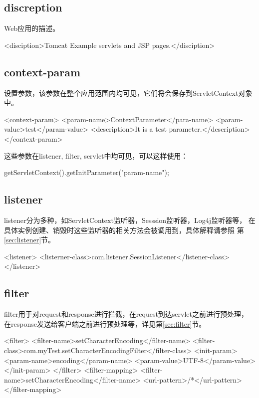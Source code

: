 \documentclass[a4paper,11pt]{article}
\begin{document}
\subsection[discreption]{discreption}
Web应用的描述。

\begin{xmlcode}
<disciption>Tomcat Example servlets and JSP pages.</disciption>
\end{xmlcode}

\subsection[context-param]{context-param}
设置参数，该参数在整个应用范围内均可见，它们将会保存到ServletContext对象中。

\begin{xmlcode}
<context-param>
    <param-name>ContextParameter</para-name>
    <param-value>test</param-value>
    <description>It is a test parameter.</description>
</context-param>
\end{xmlcode}

这些参数在listener, filter, servlet中均可见，可以这样使用：

getServletContext().getInitParameter("param-name");


\subsection[listener]{listener}
listener分为多种，如ServletContext监听器，Sesssion监听器，Log4j监听器等，
在具体实例创建、销毁时这些监听器的相关方法会被调用到，具体解释请参照
第\ref{sec:listener}节。

\begin{xmlcode}
<listener> 
    <listerner-class>com.listener.SessionListener</listener-class> 
</listener>
\end{xmlcode}

\subsection[filter]{filter}
filter用于对request和response进行拦截，在request到达servlet之前进行预处理，
在response发送给客户端之前进行预处理等，详见第\ref{sec:filter}节。

\begin{xmlcode}
<filter>
    <filter-name>setCharacterEncoding</filter-name>
    <filter-class>com.myTest.setCharacterEncodingFilter</filter-class>
    <init-param>
        <param-name>encoding</param-name>
        <param-value>UTF-8</param-value>
    </init-param>
</filter>
<filter-mapping>
    <filter-name>setCharacterEncoding</filter-name>
    <url-pattern>/*</url-pattern>
</filter-mapping>
\end{xmlcode}
\end{document}
